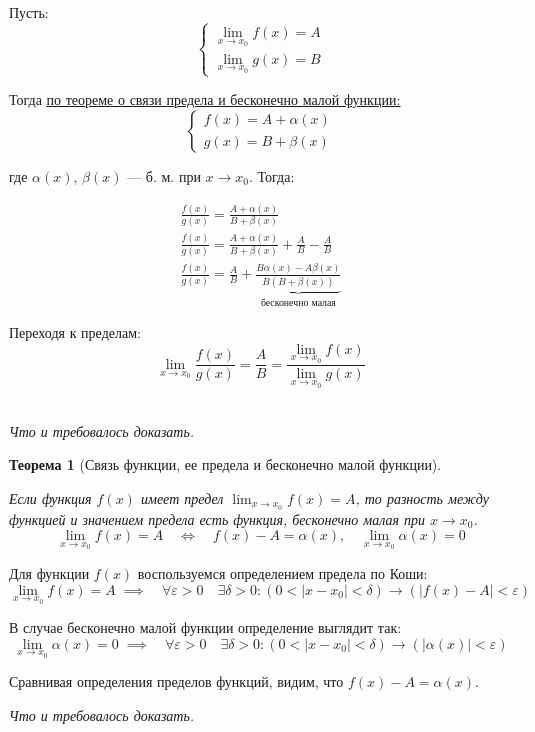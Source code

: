\documentclass[a4paper,12pt,oneside]{extbook}
\newcommand{\newpar}{$ $\par\nobreak\ignorespaces}
\theoremstyle{numbered}
\theoremstyle{unnumbered}
\theoremstyle{named}
\newtheorem{theorem}{Теорема}[section]
\theoremstyle{unnumbered}
\theoremstyle{named}
\theoremstyle{named}
\theoremstyle{named}
\renewenvironment{proof}[1][]{\breakenv[Доказательство]{\if\relax\detokenize{#1}\relax\else\;\fi}{\textbf{#1}}}{\smallskip\newpar \hfill\textit{Что и требовалось доказать.}}
\newcommand{\plink}[2]{\hyperref[#1]{\color{blue}\underline{#2}}}
\begin{document}
\begin{proof}
    Пусть:
    \[
        \begin{cases}
            \displaystyle
            \lim_{x \to x_0}{f(x)} = A \\
            \displaystyle
            \lim_{x \to x_0}{g(x)} = B
        \end{cases}
    \]

    Тогда \plink{theorem:Теорема о связи функции, ее предела и бесконечно малой функции}{по теореме о связи предела и бесконечно малой функции:}
    \[
        \begin{cases}
            f(x) = A + \alpha(x) \\
            g(x) = B + \beta(x)
        \end{cases}
    \]

    где \(\alpha(x)\), \(\beta(x)\) — б. м. при \(x \to x_0\). Тогда:

    \begin{gather*}
        \frac{f(x)}{g(x)} = \frac{A + \alpha(x)}{B + \beta(x)} \\
        \frac{f(x)}{g(x)} = \frac{A + \alpha(x)}{B + \beta(x)} + \frac{A}{B} - \frac{A}{B} \\
        \frac{f(x)}{g(x)} = \frac{A}{B} + \underbrace{\frac{B\alpha(x) - A \beta(x)}{B(B + \beta(x))}}_{\text{бесконечно малая}}
    \end{gather*}

    Переходя к пределам:
    \[
        \lim_{x \to x_0}{\dfrac{f(x)}{g(x)}} = \frac{A}{B} = \dfrac{\displaystyle \lim_{x \to x_0}{f(x)}}{\displaystyle \lim_{x \to x_0}{g(x)}}
    \]
\end{proof}

\begin{theorem}[Связь функции, ее предела и бесконечно малой функции]
    \label{theorem:Теорема о связи функции, ее предела и бесконечно малой функции}
    \newpar

    Если функция \(f(x)\) имеет предел \(\displaystyle \lim_{x \to x_0}{f(x)} = A\), то разность между функцией и значением предела есть функция, бесконечно малая при \(x \to x_0\).
    \[
        \lim_{x \to x_0}{f(x)} = A \quad \iff \quad f(x) - A = \alpha(x), \quad \lim_{x \to x_0}{\alpha(x)} = 0
    \]
\end{theorem}

\begin{proof}
    Для функции \(f(x)\) воспользуемся определением предела по Коши:
    \[
        \lim_{x \to x_0}{f(x)} = A \; \implies \quad \forall \varepsilon > 0 \quad \exists \delta > 0: (0 < |x - x_0| < \delta) \rightarrow (|f(x) - A| < \varepsilon)
    \]

    В случае бесконечно малой функции определение выглядит так:
    \[
        \lim_{x \to x_0}{\alpha(x)} = 0 \; \implies \quad \forall \varepsilon > 0 \quad \exists \delta > 0: (0 < |x - x_0| < \delta) \rightarrow (|\alpha(x)| < \varepsilon)
    \]

    Сравнивая определения пределов функций, видим, что \(f(x) - A = \alpha(x)\).
\end{proof}
\end{document}
